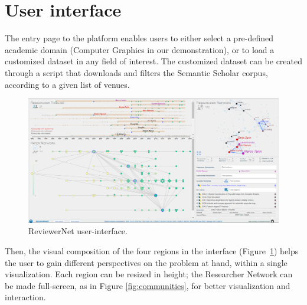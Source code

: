 \section{User interface}
\label{sec:userinterface}

The entry page to the platform enables users to either select a pre-defined academic domain (Computer Graphics in our demonstration), or to load a customized dataset in any field of interest. The customized dataset can be created through a script that downloads and filters the Semantic Scholar corpus, according to a given list of venues.

\begin{figure}[!t]
    \centering
    \includegraphics[width=\textwidth]{fig/teaser.png}
    \caption{ReviewerNet user-interface.}%
    \label{fig:interface1}
\end{figure}

Then, the visual composition of the four regions in the interface (Figure~\ref{fig:interface1}) helps the user to gain different perspectives on the problem at hand, within a single visualization. Each region can be resized in height; the Researcher Network can be made full-screen, as in Figure \ref{fig:communities}, for better visualization and interaction.

